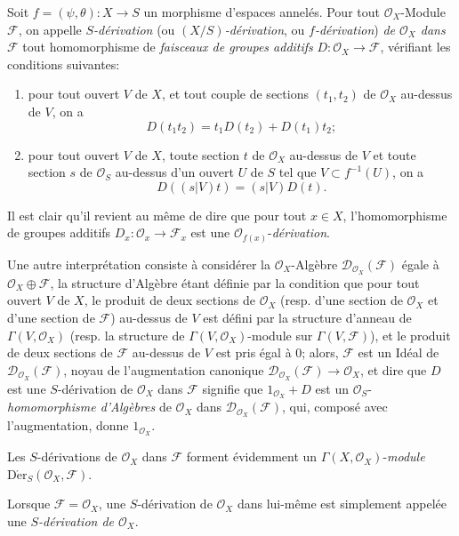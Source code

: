 \begin{env}[16.5.1]
Soit $f=(\psi,\theta):X\to S$ un morphisme d'espaces annelés. Pour tout
$\mathcal{O}_X$-Module $\mathscr{F}$, on appelle \emph{$S$-dérivation}
(ou \emph{$(X/S)$-dérivation}, ou \emph{$f$-dérivation}) \emph{de
$\mathcal{O}_X$ dans $\mathscr{F}$} tout homomorphisme de \emph{faisceaux de
groupes additifs} $D:\mathcal{O}_X\to\mathscr{F}$, vérifiant les conditions
suivantes:
\begin{enumerate}
\item[\emph{a)}] pour tout ouvert $V$ de $X$, et tout couple de sections
$(t_1,t_2)$ de $\mathcal{O}_X$ au-dessus de $V$, on a
\[
  D(t_1t_2)=t_1D(t_2)+D(t_1)t_2;
  \tag{16.5.1.1}
  \label{IV.16.5.1.1}
\]
\item[\emph{b)}] pour tout ouvert $V$ de $X$, toute section $t$ de $\mathcal{O}_X$
au-dessus de $V$ et toute section $s$ de $\mathcal{O}_S$ au-dessus d'un ouvert
$U$ de $S$ tel que $V\subset f^{-1}(U)$, on a
\[
  D((s|V)t)=(s|V)D(t).
  \tag{16.5.1.2}
  \label{IV.16.5.1.2}
\]
\end{enumerate}

Il est clair qu'il revient au même de dire que pour tout $x\in X$,
l'homomorphisme de groupes additifs
$D_x:\mathcal{O}_x\to\mathscr{F}_x$ est une
$\mathcal{O}_{f(x)}$-\emph{dérivation}.

Une autre interprétation consiste à considérer la $\mathcal{O}_X$-Algèbre
$\mathscr{D}_{\mathcal{O}_X}(\mathscr{F})$ égale à
$\mathcal{O}_X\oplus\mathscr{F}$, la structure d'Algèbre étant définie par la
condition que pour tout ouvert $V$ de $X$, le produit de deux sections de
$\mathcal{O}_X$ (resp. d'une section de $\mathcal{O}_X$ et d'une section de
$\mathscr{F}$) au-dessus de $V$ est défini par la structure d'anneau de
$\Gamma(V,\mathcal{O}_X)$ (resp. la structure de
$\Gamma(V,\mathcal{O}_X)$-module sur $\Gamma(V,\mathscr{F})$), et le produit de
deux sections de $\mathscr{F}$ au-dessus de $V$ est pris égal à 0; alors,
$\mathscr{F}$ est un Idéal de
$\mathscr{D}_{\mathcal{O}_X}(\mathscr{F})$, noyau de l'augmentation canonique
$\mathscr{D}_{\mathcal{O}_X}(\mathscr{F})\to\mathcal{O}_X$, et dire que $D$
est une $S$-dérivation de $\mathcal{O}_X$ dans $\mathscr{F}$ signifie que
$1_{\mathcal{O}_X}+D$ est un $\mathcal{O}_S$-\emph{homomorphisme d'Algèbres} de
$\mathcal{O}_X$ dans $\mathscr{D}_{\mathcal{O}_X}(\mathscr{F})$, qui, composé
avec l'augmentation, donne $1_{\mathcal{O}_X}$.

Les $S$-dérivations de $\mathcal{O}_X$ dans $\mathscr{F}$ forment évidemment
un $\Gamma(X,\mathcal{O}_X)$-\emph{module}
$\operatorname{D\acute{e}r}_S(\mathcal{O}_X,\mathscr{F})$.

Lorsque $\mathscr{F}=\mathcal{O}_X$, une $S$-dérivation de $\mathcal{O}_X$ dans
lui-même est simplement appelée une \emph{$S$-dérivation de $\mathcal{O}_X$}.
\end{env}

